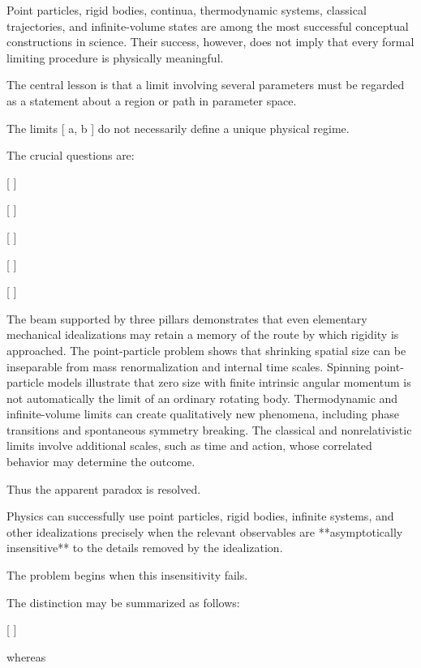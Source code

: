 Point particles, rigid bodies, continua, thermodynamic systems, classical trajectories, and infinite-volume states are among the most successful conceptual constructions in science. Their success, however, does not imply that every formal limiting procedure is physically meaningful.

The central lesson is that a limit involving several parameters must be regarded as a statement about a region or path in parameter space.

The limits
[
a,
\qquad
b
]
do not necessarily define a unique physical regime.

The crucial questions are:

[
]

[
]

[
]

[
]

[
]

The beam supported by three pillars demonstrates that even elementary mechanical idealizations may retain a memory of the route by which rigidity is approached. The point-particle problem shows that shrinking spatial size can be inseparable from mass renormalization and internal time scales. Spinning point-particle models illustrate that zero size with finite intrinsic angular momentum is not automatically the limit of an ordinary rotating body. Thermodynamic and infinite-volume limits can create qualitatively new phenomena, including phase transitions and spontaneous symmetry breaking. The classical and nonrelativistic limits involve additional scales, such as time and action, whose correlated behavior may determine the outcome.

Thus the apparent paradox is resolved.

Physics can successfully use point particles, rigid bodies, infinite systems, and other idealizations precisely when the relevant observables are **asymptotically insensitive** to the details removed by the idealization.

The problem begins when this insensitivity fails.

The distinction may be summarized as follows:

[
]

whereas

